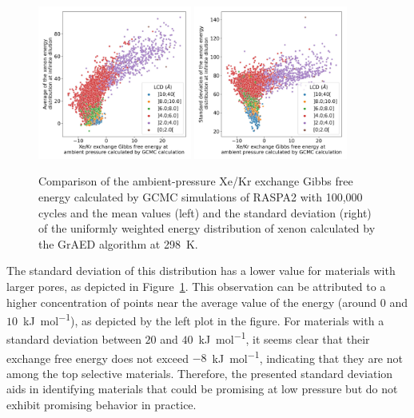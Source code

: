\documentclass[main]{subfiles}
\begin{document}
\begin{figure}[ht]
  \centering
    \includegraphics[width=0.45\textwidth]{figures/3-fastsim/G_2080_vs_mean_grid_x_overview.jpg}
    \hfill
    \includegraphics[width=0.45\textwidth]{figures/3-fastsim/G_2080_vs_std_grid_x_overview.jpg}
    \caption{Comparison of the ambient-pressure Xe/Kr exchange Gibbs free energy calculated by GCMC simulations of RASPA2 with 100,000 cycles and the mean values (left) and the standard deviation (right) of the uniformly weighted energy distribution of xenon calculated by the GrAED algorithm at \SI{298}{\kelvin}.}\label{fgr:energy_dist_mean_std}
\end{figure}

The standard deviation of this distribution has a lower value for materials with larger pores, as depicted in Figure~\ref{fgr:energy_dist_mean_std}. This observation can be attributed to a higher concentration of points near the average value of the energy (around $0$ and $10$~\si{\kilo\joule\per\mole}), as depicted by the left plot in the figure. For materials with a standard deviation between $20$ and $40$~\si{\kilo\joule\per\mole}, it seems clear that their exchange free energy does not exceed $-8$~\si{\kilo\joule\per\mole}, indicating that they are not among the top selective materials. Therefore, the presented standard deviation aids in identifying materials that could be promising at low pressure but do not exhibit promising behavior in practice.
\end{document}
